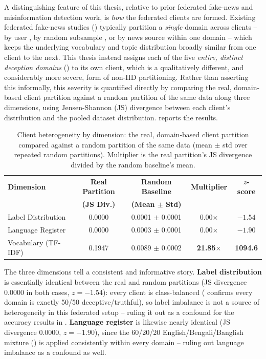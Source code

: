 A distinguishing feature of this thesis, relative to prior federated fake-news and misinformation detection work, is \emph{how} the federated clients are formed. Existing federated fake-news studies () typically partition a \emph{single} domain across clients -- by user \cite{djenouri2024federated}, by random subsample \cite{lian2024find}, or by news source within one domain \cite{marulli2021exploring} -- which keeps the underlying vocabulary and topic distribution broadly similar from one client to the next. This thesis instead assigns each of the five \emph{entire, distinct deception domains} () to its own client, which is a qualitatively different, and considerably more severe, form of non-IID partitioning. Rather than asserting this informally, this severity is quantified directly by comparing the real, domain-based client partition against a random partition of the same data along three dimensions, using Jensen-Shannon (JS) divergence between each client's distribution and the pooled dataset distribution.  reports the results.

\begin{table}[htbp]
\centering
\caption{Client heterogeneity by dimension: the real, domain-based client partition compared against a random partition of the same data (mean $\pm$ std over repeated random partitions). Multiplier is the real partition's JS divergence divided by the random baseline's mean.}
\label{tab:dataset-heterogeneity}
\begin{tabular}{@{}lccc c@{}}
\toprule
\textbf{Dimension} & \textbf{Real Partition} & \textbf{Random Baseline} & \textbf{Multiplier} & \textbf{$z$-score} \\
 & \textbf{(JS Div.)} & \textbf{(Mean $\pm$ Std)} & & \\
\midrule
Label Distribution   & 0.0000 & 0.0001 $\pm$ 0.0001 & 0.00$\times$  & $-1.54$ \\
Language Register    & 0.0000 & 0.0003 $\pm$ 0.0001 & 0.00$\times$  & $-1.90$ \\
Vocabulary (TF-IDF)   & 0.1947 & 0.0089 $\pm$ 0.0002 & \textbf{21.85$\times$} & \textbf{1094.6} \\
\bottomrule
\end{tabular}
\end{table}

The three dimensions tell a consistent and informative story. \textbf{Label distribution} is essentially identical between the real and random partitions (JS divergence 0.0000 in both cases, $z = -1.54$): every client is class-balanced ( confirms every domain is exactly 50/50 deceptive/truthful), so label imbalance is not a source of heterogeneity in this federated setup -- ruling it out as a confound for the accuracy results in . \textbf{Language register} is likewise nearly identical (JS divergence 0.0000, $z = -1.90$), since the 60/20/20 English/Bengali/Banglish mixture () is applied consistently within every domain -- ruling out language imbalance as a confound as well.


